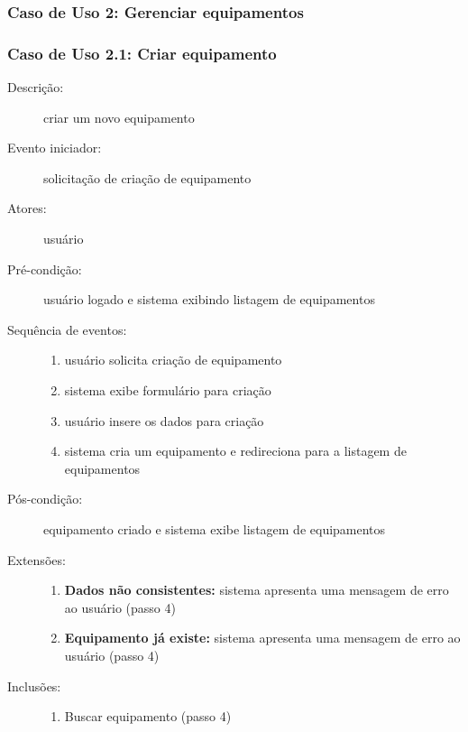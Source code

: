 \subsubsection{Caso de Uso 2: Gerenciar equipamentos}
\subsubsection{Caso de Uso 2.1: Criar equipamento}
\begin{description}
	\item[Descrição:] criar um novo equipamento
	\item[Evento iniciador:] solicitação de criação de equipamento
	\item[Atores:] usuário
	\item[Pré-condição:] usuário logado e sistema exibindo listagem de equipamentos
	\item[Sequência de eventos:] \hfill
		\begin{enumerate}
			\item{usuário solicita criação de equipamento}
			\item{sistema exibe formulário para criação}
			\item{usuário insere os dados para criação}
			\item{sistema cria um equipamento e redireciona para a listagem de equipamentos}
		\end{enumerate}
	\item[Pós-condição:] equipamento criado e sistema exibe listagem de equipamentos
	\item[Extensões:] \hfill
		\begin{enumerate}
			\item{\textbf{Dados não consistentes:} sistema apresenta uma mensagem de erro ao usuário (passo 4)}
			\item{\textbf{Equipamento já existe:} sistema apresenta uma mensagem de erro ao usuário (passo 4)}
		\end{enumerate}
	\item[Inclusões:] \hfill
		\begin{enumerate}
			\item{Buscar equipamento (passo 4)}
		\end{enumerate}
\end{description}
%

